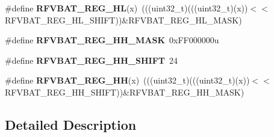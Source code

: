 \begin{DoxyCompactItemize}
\item 
\#define {\bfseries R\+F\+V\+B\+A\+T\+\_\+\+R\+E\+G\+\_\+\+HL}(x)~(((uint32\+\_\+t)(((uint32\+\_\+t)(x))$<$$<$R\+F\+V\+B\+A\+T\+\_\+\+R\+E\+G\+\_\+\+H\+L\+\_\+\+S\+H\+I\+FT))\&R\+F\+V\+B\+A\+T\+\_\+\+R\+E\+G\+\_\+\+H\+L\+\_\+\+M\+A\+SK)\hypertarget{group__RFVBAT__Register__Masks_gade785dbcefc44dd4be0a7a423e05affb}{}\label{group__RFVBAT__Register__Masks_gade785dbcefc44dd4be0a7a423e05affb}

\item 
\#define {\bfseries R\+F\+V\+B\+A\+T\+\_\+\+R\+E\+G\+\_\+\+H\+H\+\_\+\+M\+A\+SK}~0x\+F\+F000000u\hypertarget{group__RFVBAT__Register__Masks_gad2932f13b6d26fa7ccb982b9cffcd184}{}\label{group__RFVBAT__Register__Masks_gad2932f13b6d26fa7ccb982b9cffcd184}

\item 
\#define {\bfseries R\+F\+V\+B\+A\+T\+\_\+\+R\+E\+G\+\_\+\+H\+H\+\_\+\+S\+H\+I\+FT}~24\hypertarget{group__RFVBAT__Register__Masks_gae67376345507e381e7f56f8bae49359c}{}\label{group__RFVBAT__Register__Masks_gae67376345507e381e7f56f8bae49359c}

\item 
\#define {\bfseries R\+F\+V\+B\+A\+T\+\_\+\+R\+E\+G\+\_\+\+HH}(x)~(((uint32\+\_\+t)(((uint32\+\_\+t)(x))$<$$<$R\+F\+V\+B\+A\+T\+\_\+\+R\+E\+G\+\_\+\+H\+H\+\_\+\+S\+H\+I\+FT))\&R\+F\+V\+B\+A\+T\+\_\+\+R\+E\+G\+\_\+\+H\+H\+\_\+\+M\+A\+SK)\hypertarget{group__RFVBAT__Register__Masks_gad544c6138476e4e13e072614ac354d2c}{}\label{group__RFVBAT__Register__Masks_gad544c6138476e4e13e072614ac354d2c}

\end{DoxyCompactItemize}


\subsection{Detailed Description}
